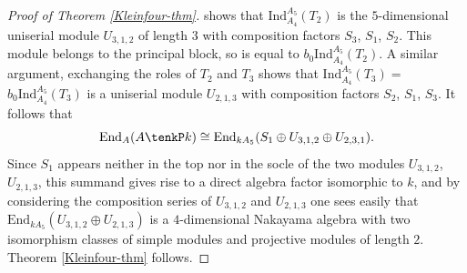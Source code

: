 \documentclass{amsart}
\theoremstyle{plain}\newtheorem{Theorem}{Theorem}[section]
\theoremstyle{plain}\newtheorem{Conjecture}[Theorem]{Conjecture}
\theoremstyle{plain}\newtheorem{Corollary}[Theorem]{Corollary}
\theoremstyle{plain}\newtheorem{Lemma}[Theorem]{Lemma}
\theoremstyle{plain}\newtheorem{Proposition}[Theorem]{Proposition}
\theoremstyle{definition}\newtheorem{Definition}[Theorem]{Definition}
\theoremstyle{definition}\newtheorem{Example}[Theorem]{Example}
\theoremstyle{definition}\newtheorem{Examples}[Theorem]{Examples}
\theoremstyle{definition}\newtheorem{Exercise}[Theorem]{Exercise}
\theoremstyle{definition}\newtheorem{Notation}[Theorem]{Notation}
\theoremstyle{definition}\newtheorem{Remark}[Theorem]{Remark}
\theoremstyle{definition}\newtheorem{Remarks}[Theorem]{Remarks}
\theoremstyle{plain}\newtheorem{Statement}[Theorem]{}
\def\End{\mathrm{End}}
\def\Ind{\mathrm{Ind}}    \def\tenC{\otimes_C}
\begin{document}
\begin{proof}[Proof of Theorem \ref{Kleinfour-thm}]
shows that $\Ind^{A_5}_{A_4}(T_2)$ is the $5$-dimensional uniserial module $U_{3,1,2}$
of length $3$ with composition factors $S_3$, $S_1$, $S_2$. This module belongs to
the principal block, so is equal to $b_0\Ind^{A_5}_{A_4}(T_2)$.
A similar argument, exchanging the roles of $T_2$ and $T_3$ shows that
$\Ind^{A_5}_{A_4}(T_3)=$ $b_0\Ind^{A_5}_{A_4}(T_3)$ is a uniserial
module $U_{2,1,3}$ with composition factors $S_2$, $S_1$, $S_3$.
It follows that
$$\End_A(A\tenkP k) \cong \End_{kA_5}(S_1 \oplus U_{3,1,2} \oplus U_{2,3,1}).$$
Since $S_1$ appears neither in the top nor in the socle of the two modules
$U_{3,1,2}$, $U_{2,1,3}$, this summand gives rise to a direct algebra factor
isomorphic to $k$, and by considering the composition series of $U_{3,1,2}$
and $U_{2,1,3}$ one sees easily that $\End_{kA_5}(U_{3,1,2}\oplus U_{2,1,3})$ is
a $4$-dimensional Nakayama algebra with two isomorphism classes of
simple modules and projective modules of length $2$.
Theorem \ref{Kleinfour-thm} follows.
\end{proof}
\end{document}
